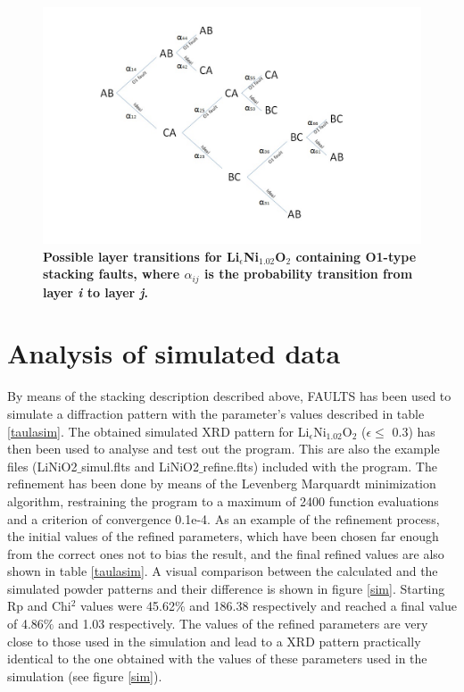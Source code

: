 \begin{figure}[h!]
\begin{center}
\includegraphics [width=5.2 in]{transitions.jpg}
\caption{\bf Possible layer transitions for Li$_{\epsilon}$Ni$_{1.02}$O$_{2}$ containing O1-type stacking faults, where $\alpha_{ij}$ is the probability transition from layer \emph{i} to layer \emph{j}.}
\label{capes}
\end{center}
\end{figure}





\section{Analysis of simulated data}
\label{Analysis of simulated data}

By  means of the  stacking description described above, FAULTS has been used to simulate a diffraction pattern with the parameter's values described in table \ref{taulasim}.
The obtained simulated XRD pattern for Li$_{\epsilon}$Ni$_{1.02}$O$_{2}$ ($\epsilon\leq$ 0.3) has then been used to analyse and test out the program. This are also the example files (LiNiO2$\_$simul.flts and LiNiO2$\_$refine.flts) included with the program. The refinement has been done by means of the Levenberg Marquardt minimization algorithm, restraining the program to a maximum of 2400 function evaluations and a criterion of convergence 0.1e-4. As an example of the refinement process, the initial values of the refined parameters, which have been chosen far enough from the correct ones not to bias the result,
and  the final refined values are also  shown in table \ref{taulasim}.
A visual comparison between the calculated and the simulated powder patterns and their difference is shown in figure \ref{sim}.
Starting Rp and Chi$^{2}$ values were 45.62$\%$  and 186.38 respectively and reached a final value of 4.86$\%$ and 1.03 respectively.
The values of the refined parameters are very close to those used in the simulation and lead to a XRD pattern practically
identical to the one obtained with the values of these parameters used in the simulation (see figure \ref{sim}).



